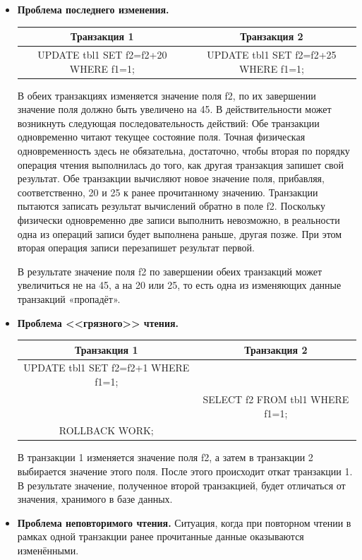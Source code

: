 \begin{itemize}[label=---]
	\item \textbf{Проблема последнего изменения.}
	
	\begin{table}[ht!]
		\begin{center}
			\label{tbl:pr1}
			\begin{tabular}{|c|c|}
				\hline
				Транзакция 1 & Транзакция 2 \\
				\hline
				UPDATE tbl1 SET f2=f2+20 WHERE f1=1; & UPDATE tbl1 SET f2=f2+25 WHERE f1=1; \\
				\hline
			\end{tabular}
		\end{center}
	\end{table}
	В обеих транзакциях изменяется значение поля f2, по их завершении значение поля должно быть
	увеличено на 45. В действительности может возникнуть следующая последовательность действий: Обе транзакции одновременно читают текущее состояние поля. Точная физическая одновременность здесь не обязательна, достаточно, чтобы вторая по порядку операция чтения выполнилась до того, как другая транзакция запишет свой результат. Обе транзакции вычисляют новое значение поля, прибавляя, соответственно, 20 и 25 к ранее прочитанному значению. Транзакции пытаются записать результат вычислений обратно в поле f2. Поскольку физически одновременно две записи выполнить невозможно, в реальности одна из операций записи будет выполнена раньше, другая позже. При этом вторая операция записи перезапишет результат первой. 
	
	В результате значение поля f2 по завершении обеих транзакций может увеличиться не на 45, а на 20
	или 25, то есть одна из изменяющих данные транзакций «пропадёт».
	
	\item \textbf{Проблема  <<грязного>> чтения.}
	\begin{table}[ht!]
		\begin{center}
			\label{tbl:pr1}
			\begin{tabular}{|c|c|}
				\hline
				Транзакция 1 & Транзакция 2 \\
				\hline
				UPDATE tbl1 SET f2=f2+1 WHERE f1=1; & \\
				& SELECT f2 FROM tbl1 WHERE f1=1; \\
				ROLLBACK WORK; & \\
				\hline
			\end{tabular}
		\end{center}
	\end{table}
	В транзакции 1 изменяется значение поля f2, а затем в транзакции 2 выбирается значение этого
	поля. После этого происходит откат транзакции 1. В результате значение, полученное второй транзакцией, будет отличаться от значения, хранимого в базе данных.
	\item \textbf{Проблема неповторимого чтения.} Ситуация, когда при повторном чтении в рамках одной транзакции ранее прочитанные данные оказываются изменёнными.
	

\end{itemize}
